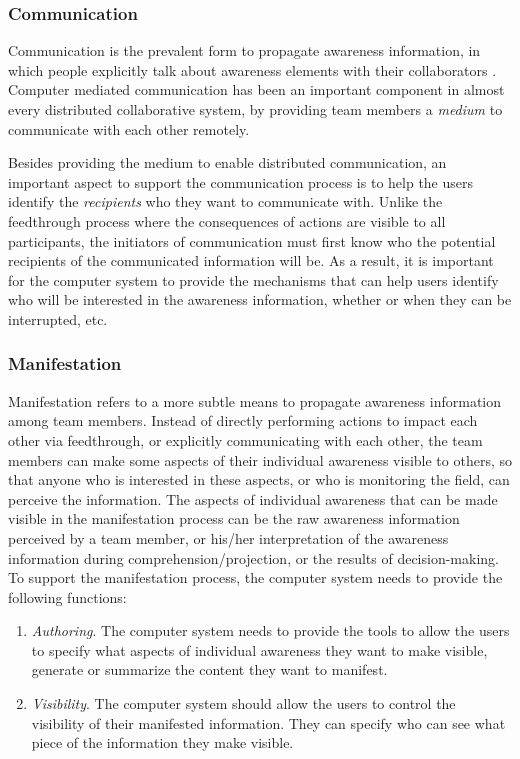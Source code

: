 \subsubsection*{Communication} %
\label{ssub:communication}
Communication is the prevalent form to propagate awareness information, in which people explicitly talk about awareness elements with their collaborators \cite{Gutwin2002}. Computer mediated communication has been an important component in almost every distributed collaborative system, by providing team members a \emph{medium} to communicate with each other remotely.

Besides providing the medium to enable distributed communication, an important aspect to support the communication process is to help the users identify the \emph{recipients} who they want to communicate with. Unlike the feedthrough process where the consequences of actions are visible to all participants, the initiators of communication must first know who the potential recipients of the communicated information will be. As a result, it is important for the computer system to provide the mechanisms that can help users identify who will be interested in the awareness information, whether or when they can be interrupted, etc.

\subsubsection*{Manifestation} %
\label{ssub:manifestation}
Manifestation refers to a more subtle means to propagate awareness information among team members. Instead of directly performing actions to impact each other via feedthrough, or explicitly communicating with each other, the team members can make some aspects of their individual awareness visible to others, so that anyone who is interested in these aspects, or who is monitoring the field, can perceive the information. The aspects of individual awareness that can be made visible in the manifestation process can be the raw awareness information perceived by a team member, or his/her interpretation of the awareness information during comprehension/projection, or the results of decision-making. To support the manifestation process, the computer system needs to provide the following functions:

\begin{enumerate}
	\item \emph{Authoring}. The computer system needs to provide the tools to allow the users to specify what aspects of individual awareness they want to make visible, generate or summarize the content they want to manifest.
	\item \emph{Visibility}. The computer system should allow the users to control the visibility of their manifested information. They can specify who can see what piece of the information they make visible.
\end{enumerate}


